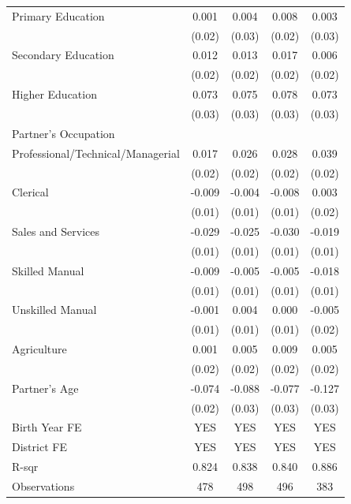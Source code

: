 \begin{longtable}{l*{4}{c}}
\hspace{1em}Primary Education & 0.001 & 0.004 & 0.008 & 0.003 \\
                    & (0.02) & (0.03) & (0.02) & (0.03) \\
\hspace{1em}Secondary Education & 0.012 & 0.013 & 0.017 & 0.006 \\
                    & (0.02) & (0.02) & (0.02) & (0.02) \\
\hspace{1em}Higher Education & 0.073\sym{***} & 0.075\sym{***} & 0.078\sym{***} & 0.073\sym{***} \\
                    & (0.03) & (0.03) & (0.03) & (0.03) \\
\multicolumn{5}{l}{Partner's Occupation} \\
\hspace{1em}Professional/Technical/Managerial & 0.017 & 0.026 & 0.028 & 0.039\sym{*} \\
                    & (0.02) & (0.02) & (0.02) & (0.02) \\
\hspace{1em}Clerical & -0.009 & -0.004 & -0.008 & 0.003 \\
                    & (0.01) & (0.01) & (0.01) & (0.02) \\
\hspace{1em}Sales and Services & -0.029\sym{**} & -0.025\sym{*} & -0.030\sym{**} & -0.019\sym{*} \\
                    & (0.01) & (0.01) & (0.01) & (0.01) \\
\hspace{1em}Skilled Manual & -0.009 & -0.005 & -0.005 & -0.018 \\
                    & (0.01) & (0.01) & (0.01) & (0.01) \\
\hspace{1em}Unskilled Manual & -0.001 & 0.004 & 0.000 & -0.005 \\
                    & (0.01) & (0.01) & (0.01) & (0.02) \\
\hspace{1em}Agriculture & 0.001 & 0.005 & 0.009 & 0.005 \\
                    & (0.02) & (0.02) & (0.02) & (0.02) \\
Partner's Age & -0.074\sym{***} & -0.088\sym{***} & -0.077\sym{***} & -0.127\sym{***} \\
                    & (0.02) & (0.03) & (0.03) & (0.03) \\
\hline
Birth Year FE & YES & YES & YES & YES \\
District FE & YES & YES & YES & YES \\
R-sqr & 0.824 & 0.838 & 0.840 & 0.886 \\
Observations & 478 & 498 & 496 & 383 \\
\hline \hline

\end{longtable}